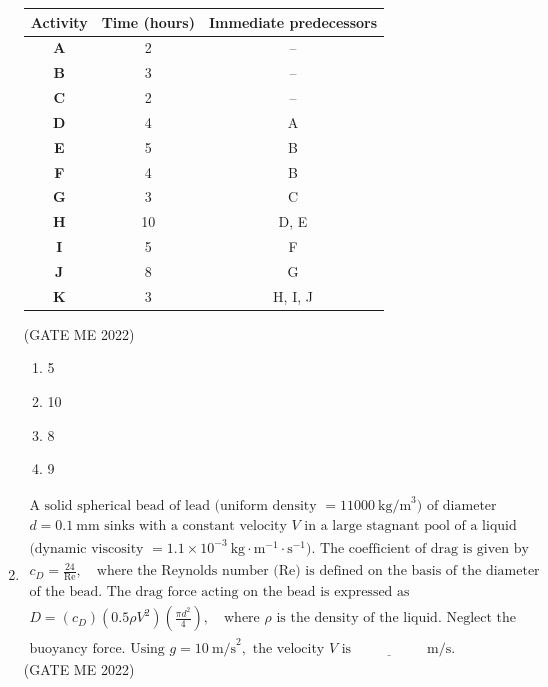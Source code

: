 \documentclass[journal]{IEEEtran}
\numberwithin{equation}{enumi}
\numberwithin{figure}{enumi}
\begin{document}
\begin{enumerate}
\begin{center}
\begin{tabular}{|>{\bfseries}c|c|c|}
\hline
Activity & Time (hours) & Immediate predecessors \\
\hline
A & 2 & -- \\
B & 3 & -- \\
C & 2 & -- \\
D & 4 & A \\
E & 5 & B \\
F & 4 & B \\
G & 3 & C \\
H & 10 & D, E \\
I & 5 & F \\
J & 8 & G \\
K & 3 & H, I, J \\
\hline
\end{tabular}
\end{center}
\hfill{(GATE ME 2022)}
 \begin{multicols}{4}
     \begin{enumerate}
         \item 5
         \item 10
         \item 8
         \item 9
     \end{enumerate}
 \end{multicols}
 \item 
 \begin{align*}
\text{A solid spherical bead of lead (uniform density } = 11000~\text{kg/m}^3) \text{ of diameter } \\
d = 0.1~\text{mm} \text{ sinks with a constant velocity } V \text{ in a large stagnant pool of a liquid} \\
\text{(dynamic viscosity } = 1.1 \times 10^{-3}~\text{kg} \cdot \text{m}^{-1} \cdot \text{s}^{-1}). \text{ The coefficient of drag is given by} \\
c_D = \frac{24}{\text{Re}}, \quad \text{where the Reynolds number (Re) is defined on the basis of the diameter} \\
\text{of the bead. The drag force acting on the bead is expressed as} \\
D = (c_D)\left(0.5 \rho V^2\right)\left(\frac{\pi d^2}{4}\right), \quad \text{where } \rho \text{ is the density of the liquid. Neglect the} \\
\text{buoyancy force. Using } g = 10~\text{m/s}^2, \text{ the velocity } V \text{ is } \underline{\hspace{2cm}} \text{ m/s}.
\end{align*}
\hfill{(GATE ME 2022)}
\begin{enumerate}
    

\end{enumerate}
\end{enumerate}
\end{document}
